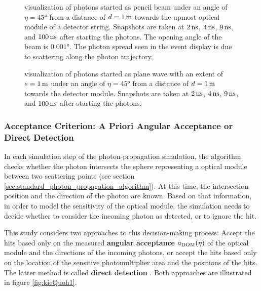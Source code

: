 \begin{figure}[htbp]
  \hfill
  \hfill
  \hfill
  \caption{\steamshovel visualization of photons started as pencil beam under an angle of $\eta = \ang{45}$ from a distance of $d = 1\text{\,m}$ towards the upmost optical module of a detector string. Snapshots are taken at $2\text{\,ns}$, $4\text{\,ns}$, $9\text{\,ns}$, and $100\text{\,ns}$ after starting the photons. The opening angle of the beam is $\ang{0.001}$. The photon spread seen in the event display is due to scattering along the photon trajectory.}
  \label{fig:Paihah7h}
\end{figure}

\begin{figure}[htbp]
  \hfill
  \hfill
  \hfill
  \caption{\steamshovel visualization of photons started as plane wave with an extent of $e = 1\text{\,m}$ under an angle of $\eta = \ang{45}$ from a distance of $d = 1\text{\,m}$ towards the detector module. Snapshots are taken at $2\text{\,ns}$, $4\text{\,ns}$, $9\text{\,ns}$, and $100\text{\,ns}$ after starting the photons.}
  \label{fig:Aehi7kae}
\end{figure}

\FloatBarrier
\subsubsection{Acceptance Criterion: A Priori Angular Acceptance or Direct Detection}
\label{sec:acception_criterion}\label{sec:a_priori_angular_acceptance}
\label{sec:direct_detection}

In each simulation step of the photon-propagation simulation, the
algorithm checks whether the photon intersects the sphere representing a
optical module between two scattering points (see section
\ref{sec:standard_photon_propagation_algorithm}). At this time, the
intersection position and the direction of the photon are known. Based
on that information, in order to model the sensitivity of the optical
module, the simulation needs to decide whether to consider the incoming
photon as detected, or to ignore the hit.

This study considers two approaches to this decision-making process:
Accept the hits based only on the measured \textbf{angular acceptance}
\(a_\text{DOM}(\eta)\) of the optical module and the directions of the incoming
photons, or accept the hits based only on the location of the sensitive
photomultiplier area and the positions of the hits. The latter method is
called \textbf{direct detection} \cite{martinspicehddard}. Both
approaches are illustrated in figure \ref{fig:kieQuoh1}.

